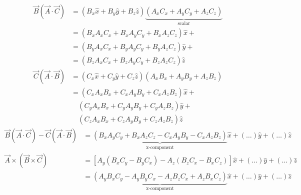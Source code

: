 \documentclass[12pt]{article}
\begin{document}
\begin{align*}
	\vec{B} (\vec{A} \cdot \vec{C}) & = (B_x \hat{x} + B_y \hat{y} + B_z \hat{z}) \underbrace{(A_x C_x + A_y C_y + A_z C_z)}_{\text{scalar}} \\
	                                & = (B_x A_x C_x + B_x A_y C_y + B_x A_z C_z )\hat{x} +                                                  \\
	                                & = (B_y A_x C_x + B_y A_y C_y + B_y A_z C_z )\hat{y} +                                                  \\
	                                & = (B_z A_x C_x + B_z A_y C_y + B_z A_z C_z )\hat{z}
\end{align*}
\begin{align*}
	\vec{C} (\vec{A} \cdot \vec{B}) & = (C_x \hat{x} + C_y \hat{y} + C_z \hat{z}) (A_x B_x + A_y B_y + A_z B_z) \\
	                                & = (C_x A_x B_x + C_x A_y B_y + C_x A_z B_z )\hat{x} +                     \\
	                                & \quad (C_y A_x B_x + C_y A_y B_y + C_y A_z B_z )\hat{y} +                 \\
	                                & \quad (C_z A_x B_x + C_z A_y B_y + C_z A_z B_z )\hat{z}
\end{align*}
\begin{align*}
	\vec{B} (\vec{A} \cdot \vec{C}) - \vec{C} (\vec{A} \cdot \vec{B}) & = \underbrace{(B_x A_y C_y + B_x A_z C_z - C_x A_y B_y - C_x A_z B_z)}_{\text{x-component}}\hat{x} + (\dots) \hat{y} + (\dots) \hat{z} \\
	\vec{A} \times (\vec{B} \times \vec{C})                           & =[A_y(B_x C_y - B_y C_x) - A_z(B_z C_x - B_x C_z)]\hat{x} + (\dots) \hat{y} + (\dots) \hat{z}                                          \\
	                                                                  & = \underbrace{(A_y B_x C_y - A_y B_y C_x - A_z B_z C_x + A_z B_x C_z)}_{\text{x-component}}\hat{x} + (\dots) \hat{y} + (\dots) \hat{z}
\end{align*}
\end{document}
